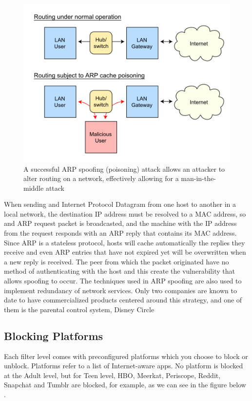 \begin{figure}[th]
\centering
\includegraphics[width=1\textwidth]{Figures/arp-spoofing}
\decoRule
\caption{A successful ARP spoofing (poisoning) attack allows an attacker to alter routing on a network, effectively allowing for a man-in-the-middle attack}
\label{fig:arp-spoofing}
\end{figure}

When sending and Internet Protocol Datagram from one host to another in a local network, the destination IP address must be resolved to a MAC address, so and ARP request packet is broadcasted, and the machine with the IP address from the request responds with an ARP reply that contains its MAC address. Since ARP is a stateless protocol, hosts will cache automatically the replies they receive and even ARP entries that have not expired yet will be overwritten when a new reply is received. The peer from which the packet originated have no method of authenticating with the host and this create the vulnerability that allows spoofing to occur. The techniques used in ARP spoofing are also used to implement redundancy of network services. Only two companies are known to date to have commercialized products centered around this strategy, and one of them is the parental control system, Disney Circle

\subsection{Blocking Platforms}

Each filter level comes with preconfigured platforms which you choose to block or unblock. Platforms refer to a list of Internet-aware apps. No platform is blocked at the Adult level, but for Teen level, HBO, Meerkat, Periscope, Reddit, Snapchat and Tumblr are blocked, for example, as we can see in the figure below \citep{circleMashable}.

